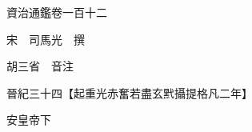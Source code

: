 










 


 
 


 

  
  
  
  
  





  
  
  
  
  
 
  

  

  
  
  



  

 
 

  
   




  

  
  


  　　資治通鑑卷一百十二

　　宋　司馬光　撰

　　胡三省　音注

　　晉紀三十四【起重光赤奮若盡玄黓攝提格凡二年】

　　安皇帝下

